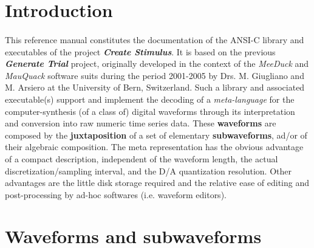 \label{appendix:stimgen}


\section{Introduction}

\paragraph{}
This reference manual constitutes the documentation of the ANSI-C library and executables of the project
\textbf{\textit{Create Stimulus}}. It is based on the previous \textbf{\textit{Generate Trial}} project, originally
developed in the context of the \textit{MeeDuck} and \textit{MauQuack} software suits during the period 2001-2005 by
Drs. M. Giugliano and M. Arsiero at the University of Bern, Switzerland. Such a library and associated executable(s)
support and implement the decoding of a \textit{meta-language} for the computer-synthesis (of a class of) digital
waveforms through its interpretation and conversion into raw numeric time series data. These \textbf{waveforms} are
composed by the \textbf{juxtaposition} of a set of elementary \textbf{subwaveforms}, ad/or of their algebraic
composition. The meta representation has the obvious advantage of a compact description, independent of the waveform
length, the actual discretization/sampling interval, and the D/A quantization resolution. Other advantages are the
little disk storage required and the relative ease of editing and post-processing by ad-hoc softwares (i.e. waveform
editors).

\section{Waveforms and subwaveforms}
